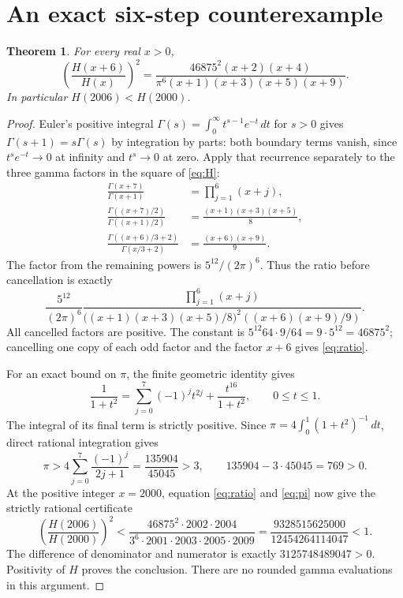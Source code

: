 \documentclass[11pt]{article}
\newtheorem{theorem}{Theorem}
\begin{document}
\section{An exact six-step counterexample}\label{sec:counterexample}
\begin{theorem}\label{thm:ratio}
For every real $x>0$,
\begin{equation}\label{eq:ratio}
\left(\frac{H(x+6)}{H(x)}\right)^2
=\frac{46875^2(x+2)(x+4)}
{\pi^6(x+1)(x+3)(x+5)(x+9)}.
\end{equation}
In particular $H(2006)<H(2000)$.
\end{theorem}
\begin{proof}
Euler's positive integral
$\Gamma(s)=\int_0^\infty t^{s-1}e^{-t}\,dt$ for $s>0$
gives $\Gamma(s+1)=s\Gamma(s)$ by integration by parts: both
boundary terms vanish, since $t^se^{-t}\to0$ at infinity and
$t^s\to0$ at zero. Apply that recurrence separately to the
three gamma factors in the square of \eqref{eq:H}:
\begin{align}
\frac{\Gamma(x+7)}{\Gamma(x+1)}
&=\prod_{j=1}^6(x+j),\label{eq:factorialratio}\\
\frac{\Gamma((x+7)/2)}{\Gamma((x+1)/2)}
&=\frac{(x+1)(x+3)(x+5)}8,\label{eq:halfratio}\\
\frac{\Gamma((x+6)/3+2)}{\Gamma(x/3+2)}
&=\frac{(x+6)(x+9)}9.\label{eq:thirdratio}
\end{align}
The factor from the remaining powers is $5^{12}/(2\pi)^6$.
Thus the ratio before cancellation is exactly
\[
\frac{5^{12}}{(2\pi)^6}
\frac{\prod_{j=1}^6(x+j)}
{\bigl((x+1)(x+3)(x+5)/8\bigr)^2
 ((x+6)(x+9)/9)}.
\]
All cancelled factors are positive. The constant is
$5^{12}64\cdot9/64=9\cdot5^{12}=46875^2$;
cancelling one copy of each odd factor and the factor $x+6$
gives \eqref{eq:ratio}.

For an exact bound on $\pi$, the finite geometric identity gives
\[
\frac1{1+t^2}=\sum_{j=0}^7(-1)^jt^{2j}
+\frac{t^{16}}{1+t^2},\qquad 0\le t\le1.
\]
The integral of its final term is strictly positive. Since
$\pi=4\int_0^1(1+t^2)^{-1}\,dt$, direct rational integration gives
\begin{equation}\label{eq:pi}
\pi>4\sum_{j=0}^7\frac{(-1)^j}{2j+1}
=\frac{135904}{45045}>3,
\qquad 135904-3\cdot45045=769>0.
\end{equation}
At the positive integer $x=2000$, equation \eqref{eq:ratio} and
\eqref{eq:pi} now give the strictly rational certificate
\begin{equation}\label{eq:certificate}
\left(\frac{H(2006)}{H(2000)}\right)^2
<\frac{46875^2\cdot2002\cdot2004}
{3^6\cdot2001\cdot2003\cdot2005\cdot2009}
=\frac{9328515625000}{12454264114047}<1.
\end{equation}
The difference of denominator and numerator is exactly
$3125748489047>0$. Positivity of $H$ proves the conclusion.
There are no rounded gamma evaluations in this argument.
\end{proof}
\end{document}
